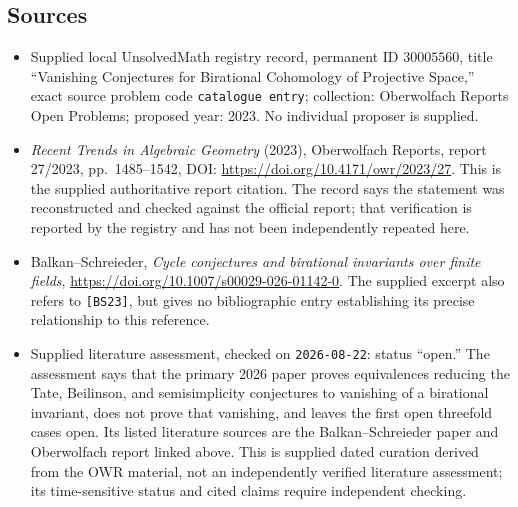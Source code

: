 \documentclass[11pt]{article}
\begin{document}
\subsection{Sources}
\begin{itemize}
\item Supplied local UnsolvedMath registry record, permanent ID \(30005560\), title ``Vanishing Conjectures for Birational Cohomology of Projective Space,'' exact source problem code \texttt{catalogue entry}; collection: Oberwolfach Reports Open Problems; proposed year: 2023. No individual proposer is supplied.
\item \emph{Recent Trends in Algebraic Geometry} (2023), Oberwolfach Reports, report 27/2023, pp.\ 1485--1542, DOI: \url{https://doi.org/10.4171/owr/2023/27}. This is the supplied authoritative report citation. The record says the statement was reconstructed and checked against the official report; that verification is reported by the registry and has not been independently repeated here.
\item Balkan--Schreieder, \emph{Cycle conjectures and birational invariants over finite fields}, \url{https://doi.org/10.1007/s00029-026-01142-0}. The supplied excerpt also refers to \texttt{[BS23]}, but gives no bibliographic entry establishing its precise relationship to this reference.
\item Supplied literature assessment, checked on \texttt{2026-08-22}: status ``open.'' The assessment says that the primary 2026 paper proves equivalences reducing the Tate, Beilinson, and semisimplicity conjectures to vanishing of a birational invariant, does not prove that vanishing, and leaves the first open threefold cases open. Its listed literature sources are the Balkan--Schreieder paper and Oberwolfach report linked above. This is supplied dated curation derived from the OWR material, not an independently verified literature assessment; its time-sensitive status and cited claims require independent checking.
\end{itemize}
\end{document}
